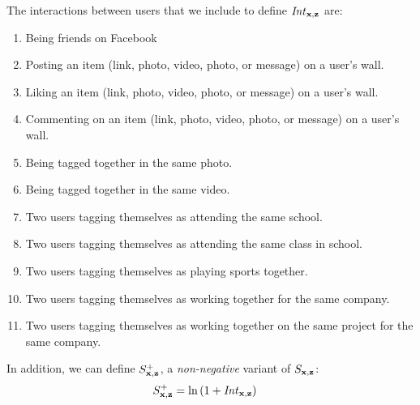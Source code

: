 \begin{itemize}
The interactions between users that we include to define $\mathit{Int}_{\mathbf{x},\mathbf{z}}$ are:

\begin{enumerate}
\item{Being friends on Facebook}
\item{Posting an item (link, photo, video, photo, or message) on a user's wall.}
\item{Liking an item (link, photo, video, photo, or message) on a user's wall.}
\item{Commenting on an item (link, photo, video, photo, or message) on a user's wall.}
\item{Being tagged together in the same photo.}
\item{Being tagged together in the same video.}
\item{Two users tagging themselves as attending the same school.}
\item{Two users tagging themselves as attending the same class in school.}
\item{Two users tagging themselves as playing sports together.}
\item{Two users tagging themselves as working together for the same company.}
\item{Two users tagging themselves as working together on the same project for the same company.}
\end{enumerate}



In addition, we can define $S^+_{\mathbf{x},\mathbf{z}}$, a \emph{non-negative} 
variant of $S_{\mathbf{x},\mathbf{z}}$:
\begin{align}
S^+_{\mathbf{x},\mathbf{z}} & = \ln \left( 1 + \mathit{Int}_{\mathbf{x},\mathbf{z}} \right)
\end{align}
\end{itemize}

%

